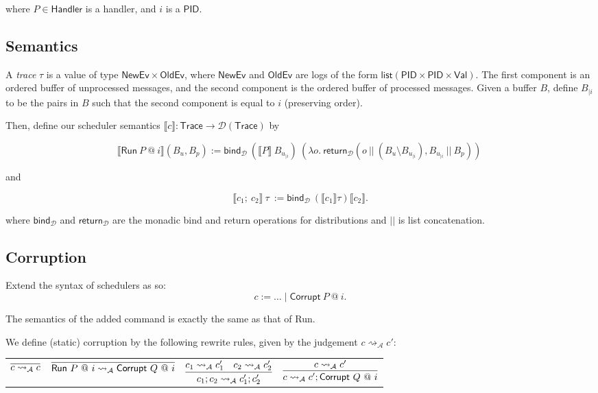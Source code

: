 \documentclass{article}
\newcommand{\Val}{\mathsf{Val}}
\newcommand{\PID}{\mathsf{PID}}
\newcommand{\Handler}{\mathsf{Handler}}
\newcommand{\List}{\mathsf{list}}
\newcommand{\D}{\mathcal{D}}
\newcommand{\NewEv}{\mathsf{NewEv}}
\newcommand{\OldEv}{\mathsf{OldEv}}
\begin{document}
where $P \in \Handler$ is a handler, and $i$ is a $\PID$.

\subsection{Semantics}

A \emph{trace} $\tau$ is a value of type $\NewEv \times \OldEv$, where $\NewEv$ and $\OldEv$ are logs of the form $\List (\PID \times \PID \times \Val)$. The first component is an ordered buffer of unprocessed messages, and the second component is the ordered buffer of processed messages. Given a buffer $B$, define $B_{| i}$ to be the pairs in $B$ such that the second component is equal to $i$ (preserving order).

Then, define our scheduler semantics $\llbracket c \rrbracket : \textsf{Trace} \to \D(\textsf{Trace})$ by

\[\llbracket \textsf{Run}\ P\ @\ i \rrbracket (B_u, B_p) := \textsf{bind}_{\D}\ (\llbracket P \rrbracket\ B_{u_{| i}})\ (\lambda o.\ \textsf{return}_{\D} (o\ ||\ (B_u \setminus B_{u_{| i}}), B_{u_{| i}}\ ||\ B_p))\ \]

and

\[\llbracket c_1;\ c_2 \rrbracket\ \tau\ := \textsf{bind}_{\D}\ (\llbracket c_1 \rrbracket \tau) \llbracket c_2 \rrbracket.\]

where $\textsf{bind}_{\D}$ and $\textsf{return}_{\D}$ are the monadic bind and return operations for distributions and $||$ is list concatenation.

\subsection{Corruption}

Extend the syntax of schedulers as so:
\[ c := \dots \mid \textsf{Corrupt}\ P\ @\ i.\]

The semantics of the added command is exactly the same as that of \textsf{Run}.

We define (static) corruption by the following rewrite rules, given by the judgement $c \rightsquigarrow_{\mathcal{A}} c'$:

\begin{tabular}{cccc}
    $\infer{c \rightsquigarrow_{\mathcal{A}} c}{}$ & 
    $\infer{\textsf{Run}\ P\ @\ i \rightsquigarrow_{\mathcal{A}} \textsf{Corrupt}\ Q\ @\ i}{}$ &
    $\infer{c_1;c_2 \rightsquigarrow_{\mathcal{A}} c_1'; c_2'} {c_1 \rightsquigarrow_\mathcal{A} c_1' & c_2 \rightsquigarrow_\mathcal{A} c_2'}$ &
    $\infer{c \rightsquigarrow_{\mathcal{A}} c'; \textsf{Corrupt}\ Q\ @\ i}{c \rightsquigarrow_\mathcal{A} c'}$ \\
\end{tabular}
\end{document}
